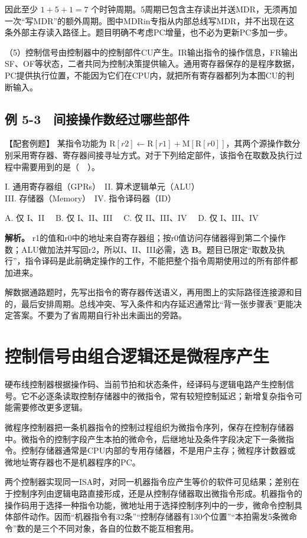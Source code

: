 因此至少 \(1+5+1=7\) 个时钟周期。5周期已包含主存读出并送MDR，无须再加一次``写MDR''的额外周期。图中MDRin专指从内部总线写MDR，并不出现在这条外部主存读入路径上。题目明确不考虑PC增量，也不必为更新PC多加一步。

（5）控制信号由控制器中的控制部件CU产生。IR输出指令的操作信息，FR输出SF、OF等状态，二者共同为控制决策提供输入。通用寄存器保存的是程序数据，PC提供执行位置，不能因为它们在CPU内，就把所有寄存器都列为本图CU的判断输入。

\subsection{例 5-3　间接操作数经过哪些部件}\label{CO05-example-3}

【配套例题】 某指令功能为 \(\mathrm R[r2]\leftarrow\mathrm R[r1]+\mathrm M[\mathrm R[r0]]\)，其两个源操作数分别采用寄存器、寄存器间接寻址方式。对于下列给定部件，该指令在取数及执行过程中需要用到的是（　）。

I. 通用寄存器组（GPRs）　II. 算术逻辑单元（ALU）\\
III. 存储器（Memory）　IV. 指令译码器（ID）

A. 仅 I、II　 B. 仅 I、II、III　 C. 仅 II、III、IV　 D. 仅 I、III、IV

\textbf{解析。} r1的值和r0中的地址来自寄存器组；按r0值访问存储器得到第二个操作数；ALU做加法并写回r2，所以I、II、III必需，选 \textbf{B}。题目已限定``取数及执行''，指令译码是此前确定操作的工作，不能把整个指令周期使用过的所有部件都加进来。

解数据通路题时，先写出指令的寄存器传送语义，再用图上的实际路径连接源和目的，最后安排周期。总线冲突、写入条件和内存延迟通常比``背一张步骤表''更能决定答案。不要为了省周期自行补出未画出的旁路。

\section{控制信号由组合逻辑还是微程序产生}\label{CO05-control}

硬布线控制器根据操作码、当前节拍和状态条件，经译码与逻辑电路产生控制信号。它不必逐条读取控制存储器中的微指令，常有较短控制延迟；新增复杂指令可能需要修改更多逻辑。

微程序控制器把一条机器指令的控制过程组织为微指令序列，保存在控制存储器中。微指令的控制字段产生本拍的微命令，后继地址及条件字段决定下一条微指令。控制存储器通常是CPU内部的专用存储器，不是用户主存；微程序计数器或微地址寄存器也不是机器程序的PC。

两个控制器实现同一ISA时，对同一机器指令应产生等价的软件可见结果；差别在于控制序列由逻辑电路直接形成，还是从控制存储器取出微指令形成。机器指令的操作码用于选择一种指令功能，微地址用于选择控制序列中的一步，微命令控制具体部件动作。因而``机器指令有32条''``控制存储器有130个位置''``本拍需发5条微命令''数的是三个不同对象，各自的位数不能互相套用。

